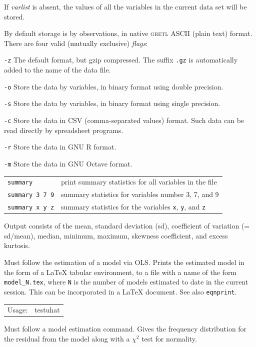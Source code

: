 \documentclass{article}
\begin{document}
{If \textit{varlist} is absent, the values of all the variables in the
current data set will be stored.

By default storage is by observations, in native \textsc{gretl} ASCII
(plain text) format.  There are four valid (mutually exclusive)
\textit{flags}:

\texttt{-z} \quad The default format, but gzip compressed.  The suffix
\texttt{.gz} is automatically added to the name of the data file.

\texttt{-o} \quad Store the data by variables, in binary format using
double precision.

\texttt{-s} \quad Store the data by variables, in binary format using
single precision.
 
\texttt{-c} \quad Store the data in CSV (comma-separated values)
format.  Such data can be read directly by spreadsheet programs.

\texttt{-r} \quad Store the data in GNU R format.

\texttt{-m} \quad Store the data in GNU Octave format.


\begin{tabular}{lp{4in}}
\texttt{summary}  &
  print summary statistics for all variables in the file \\
\texttt{summary 3 7 9} &
  summary statistics for variables number 3, 7, and 9 \\
\texttt{summary x y z} &
  summary statistics for the variables \texttt{x}, 
  \texttt{y}, and \texttt{z}
\end{tabular}

Output consists of the mean, standard deviation (sd), coefficient of
variation (= sd/mean), median, minimum, maximum, skewness
coefficient, and excess kurtosis.


Must follow the estimation of a model via OLS.  Prints the estimated
model in the form of a \LaTeX{} tabular environment, to a file with a
name of the form \texttt{model\_N.tex}, where \texttt{N} is the
number of models estimated to date in the current session.  This can
be incorporated in a \LaTeX{} document.  See also \texttt{eqnprint}.


\begin{tabular}{ll}
Usage:   &       testuhat
\end{tabular}

Must follow a model estimation command.  Gives the frequency
distribution for the residual from the model along with a $\chi^2$
test for normality.

}
\end{document}
